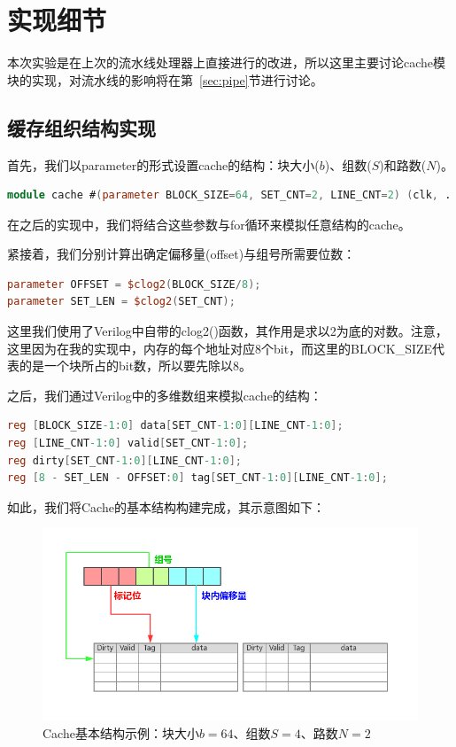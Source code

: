 \documentclass[12pt]{article} %
\begin{document}
\begin{sloppypar}
\newpage
\section{实现细节}

本次实验是在上次的流水线处理器上直接进行的改进，所以这里主要讨论cache模块的实现，对流水线的影响将在第~\ref{sec:pipe}节进行讨论。

\subsection{缓存组织结构实现}

首先，我们以parameter的形式设置cache的结构：块大小($b$)、组数($S$)和路数($N$)。
\begin{lstlisting}[language=Verilog]
module cache #(parameter BLOCK_SIZE=64, SET_CNT=2, LINE_CNT=2) (clk, ...);
\end{lstlisting} 
在之后的实现中，我们将结合这些参数与for循环来模拟任意结构的cache。

紧接着，我们分别计算出确定偏移量(offset)与组号所需要位数：
\begin{lstlisting}[language=Verilog]
parameter OFFSET = $clog2(BLOCK_SIZE/8);
parameter SET_LEN = $clog2(SET_CNT);
\end{lstlisting} 
这里我们使用了Verilog中自带的clog2()函数，其作用是求以2为底的对数。注意，这里因为在我的实现中，内存的每个地址对应8个bit，而这里的BLOCK\_SIZE代表的是一个块所占的bit数，所以要先除以8。

之后，我们通过Verilog中的多维数组来模拟cache的结构：
\begin{lstlisting}[language=Verilog]
reg [BLOCK_SIZE-1:0] data[SET_CNT-1:0][LINE_CNT-1:0];
reg [LINE_CNT-1:0] valid[SET_CNT-1:0];
reg dirty[SET_CNT-1:0][LINE_CNT-1:0];
reg [8 - SET_LEN - OFFSET:0] tag[SET_CNT-1:0][LINE_CNT-1:0];
\end{lstlisting} 

如此，我们将Cache的基本结构构建完成，其示意图如下：
\begin{figure}[h]
\centering
\includegraphics[width =\linewidth]{figure/ex.jpg}
\caption{Cache基本结构示例：块大小$b=64$、组数$S=4$、路数$N=2$}
\end{figure}


\end{sloppypar}
\end{document}
